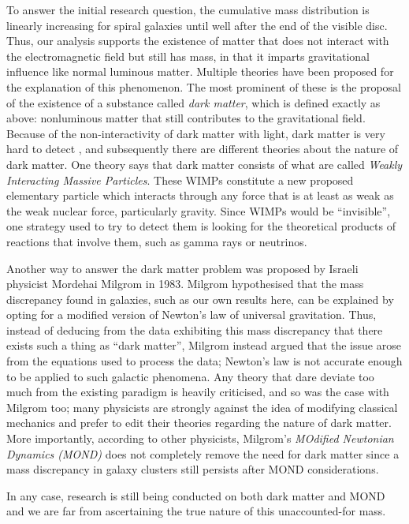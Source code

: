 \documentclass{article}
\begin{document}
To answer the initial research question, the cumulative mass distribution is linearly increasing for spiral galaxies until well after the end of the visible disc.
Thus, our analysis supports the existence of matter that does not interact with the electromagnetic field but still has mass, in that it imparts gravitational influence like normal luminous matter.
Multiple theories have been proposed for the explanation of this phenomenon.
The most prominent of these is the proposal of the existence of a substance called \textit{dark matter}, which is defined exactly as above: nonluminous matter that still contributes to the gravitational field.
Because of the non-interactivity of dark matter with light, dark matter is very hard to detect \Cite{CERN}, and subsequently there are different theories about the nature of dark matter.
One theory says that dark matter consists of what are called \textit{Weakly Interacting Massive Particles}.
These WIMPs constitute a new proposed elementary particle which interacts through any force that is at least as weak as the weak nuclear force, particularly gravity.
Since WIMPs would be ``invisible'', one strategy used to try to detect them is looking for the theoretical products of reactions that involve them, such as gamma rays or neutrinos.

Another way to answer the dark matter problem was proposed by Israeli physicist Mordehai Milgrom in 1983.
Milgrom hypothesised that the mass discrepancy found in galaxies, such as our own results here, can be explained by opting for a modified version of Newton's law of universal gravitation.
Thus, instead of deducing from the data exhibiting this mass discrepancy that there exists such a thing as ``dark matter'', Milgrom instead argued that the issue arose from the equations used to process the data; Newton's law is not accurate enough to be applied to such galactic phenomena.
Any theory that dare deviate too much from the existing paradigm is heavily criticised, and so was the case with Milgrom too; many physicists are strongly against the idea of modifying classical mechanics and prefer to edit their theories regarding the nature of dark matter.
More importantly, according to other physicists, Milgrom's \textit{MOdified Newtonian Dynamics (MOND)} does not completely remove the need for dark matter since a mass discrepancy in galaxy clusters still persists after MOND considerations.

In any case, research is still being conducted on both dark matter and MOND and we are far from ascertaining the true nature of this unaccounted-for mass.
\end{document}
